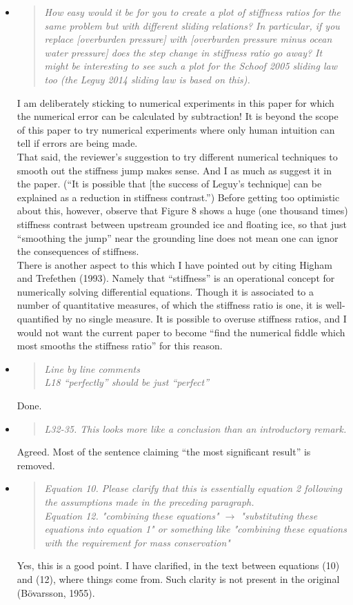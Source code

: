 \documentclass[11pt,reqno]{amsart}
\renewcommand{\dh}{\fontencoding{T1}\selectfont{\symbol{240}}}
\newcommand{\citepbod}{(B\"o\dh varsson, 1955)\nocite{Bodvardsson}\xspace}
\newcommand{\reply}[2]{
\medskip\medskip
\item  \begin{quote}
\emph{#1}
\end{quote}

\medskip
\noindent #2}
\begin{document}
\begin{itemize}
\reply{How easy would it be for you to create a plot of stiffness ratios for the same problem but with different sliding relations? In particular, if you replace [overburden pressure] with [overburden pressure minus ocean water pressure] does the step change in stiffness ratio go away? It might be interesting to see such a plot for the Schoof 2005 sliding law too (the Leguy 2014 sliding law is based on this).}
{I am deliberately sticking to numerical experiments in this paper for which the numerical error can be calculated by subtraction!  It is beyond the scope of this paper to try numerical experiments where only human intuition can tell if errors are being made. \medskip \\
That said, the reviewer's suggestion to try different numerical techniques to smooth out the stiffness jump makes sense.  And I as much as suggest it in the paper.  (``It is possible that [the success of Leguy's technique] can be explained as a reduction in stiffness contrast.'')  Before getting too optimistic about this, however, observe that Figure 8 shows a huge (one thousand times) stiffness contrast between upstream grounded ice and floating ice, so that just ``smoothing the jump'' near the grounding line does not mean one can ignor the consequences of stiffness. \medskip \\
There is another aspect to this which I have pointed out by citing Higham and Trefethen (1993).  Namely that ``stiffness'' is an operational concept for numerically solving differential equations.  Though it is associated to a number of quantitative measures, of which the stiffness ratio is one, it is well-quantified by no single measure.  It is possible to overuse stiffness ratios, and I would not want the current paper to become ``find the numerical fiddle which most smooths the stiffness ratio'' for this reason.}

\reply{Line by line comments \smallskip \\
L18 ``perfectly'' should be just ``perfect''}
{Done.}

\reply{L32-35. This looks more like a conclusion than an introductory remark.}
{Agreed.  Most of the sentence claiming ``the most significant result'' is removed.}

\reply{Equation 10. Please clarify that this is essentially equation 2 following the assumptions made in the preceding paragraph. \smallskip \\
Equation 12. "combining these equations" $\to$ "substituting these equations into equation 1" or something like "combining these equations with the requirement for mass conservation"}
{Yes, this is a good point.  I have clarified, in the text between equations (10) and (12), where things come from.  Such clarity is not present in the original \citepbod.}


\end{itemize}
\end{document}

